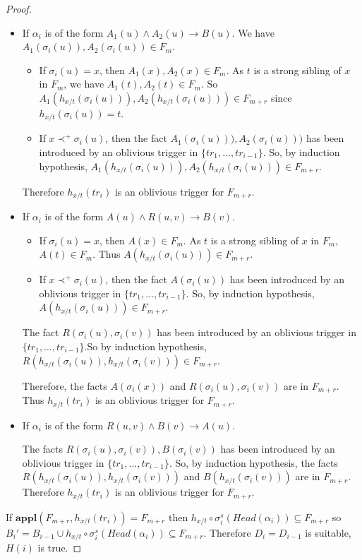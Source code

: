 \documentclass{article}
\theoremstyle{definition}
\theoremstyle{remark}
\newcommand{\Appl}{\textbf{appl}}
\begin{document}
\begin{proof}
\begin{itemize}
	\item If $\alpha_i$ is of the form $A_1(u) \wedge A_2(u) \rightarrow B(u)$. We have $A_1(\sigma_i(u)),A_2(\sigma_i(u)) \in F_m$.
		\begin{itemize}
		\item If $\sigma_i(u) = x$, then $A_1(x),A_2(x) \in F_m$. As $t$ is a strong sibling of $x$ in $F_m$, we have $A_1(t),A_2(t) \in F_m$. So $A_1(h_{x/t}(\sigma_i(u))),A_2(h_{x/t}(\sigma_i(u))) \in F_{m+r}$ since $h_{x/t}(\sigma_i(u)) = t$.  
		\item If $x \prec^+ \sigma_i(u)$, then the fact $A_1(\sigma_i(u))),A_2(\sigma_i(u)))$ has been introduced by an oblivious trigger in $\{tr_1,\ldots,tr_{i-1}\}$. So, by induction hypothesis, $A_1(h_{x/t}(\sigma_i(u))),A_2(h_{x/t}(\sigma_i(u))) \in F_{m+r}$.
		\end{itemize}
Therefore $h_{x/t}(tr_{i})$ is an oblivious trigger for $F_{m+r}$.  

\item If $\alpha_i$ is of the form $A(u) \wedge R(u,v) \rightarrow B(v)$.
	\begin{itemize}
		\item If $\sigma_i(u) = x$, then $A(x) \in F_m$. As $t$ is a strong sibling of $x$ in $F_m$, $A(t)\in F_m$. Thus $A(h_{x/t}(\sigma_i(u))) \in F_{m+r}$.
		\item If $x \prec^+ \sigma_i(u)$, then the fact $A(\sigma_i(u))$ has been introduced by an oblivious trigger in $\{tr_1,\ldots,tr_{i-1}\}$. So, by induction hypothesis, $A(h_{x/t}(\sigma_i(u))) \in F_{m+r}$. 
		\end{itemize}
The fact $R(\sigma_i(u),\sigma_i(v))$ has been introduced by an oblivious trigger in $\{tr_1,\ldots,tr_{i-1}\}$.So by induction hypothesis, $R(h_{x/t}(\sigma_i(u)),h_{x/t}(\sigma_i(v))) \in F_{m+r}$. 

Therefore, the facts $A(\sigma_i(x))$ and $R(\sigma_i(u),\sigma_i(v))$ are in $ F_{m+r}$. Thus $h_{x/t}(tr_{i})$ is an oblivious trigger for $F_{m+r}$.
\item If $\alpha_i$ is of the form $R(u,v) \wedge B(v) \rightarrow A(u)$.

The facts $R(\sigma_i(u),\sigma_i(v)),B(\sigma_i(v))$ has been introduced by an oblivious trigger in $\{tr_1,\ldots,tr_{i-1}\}$. So, by induction hypothesis, the facts $R(h_{x/t}(\sigma_i(u)),h_{x/t}(\sigma_i(v)))$ and $B(h_{x/t}(\sigma_i(v)))$ are in $ F_{m+r}$. Therefore $h_{x/t}(tr_{i})$ is an oblivious trigger for $F_{m+r}$.
	\end{itemize} 
If $\Appl(F_{m+r},h_{x/t}(tr_{i})) = F_{m+r}$ then $h_{x/t} \circ \sigma_i^s(Head(\alpha_i)) \subseteq F_{m+r}$ so $B_i' = B_{i-1} \cup h_{x/t} \circ \sigma_i^s(Head(\alpha_i)) 	\subseteq F_{m+r}$. Therefore $D_i = D_{i-1}$ is suitable, $H(i)$ is true.


\end{proof}
\end{document}
